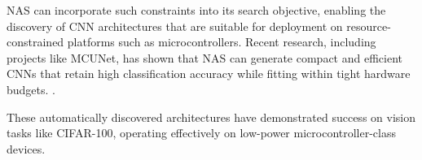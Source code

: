 NAS can incorporate such constraints into its search objective, enabling the discovery of CNN architectures that are suitable for deployment on resource-constrained platforms such as microcontrollers. Recent research, including projects like MCUNet, has shown that NAS can generate compact and efficient CNNs that retain high classification accuracy while fitting within tight hardware budgets. \cite{pau2023quantitative}.

These automatically discovered architectures have demonstrated success on vision tasks like CIFAR-100, operating effectively on low-power microcontroller-class devices.